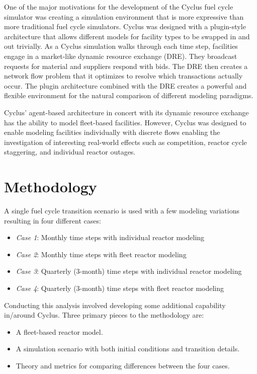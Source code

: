 \documentclass{style}
\begin{document}
One of the major motivations for the development of the Cyclus fuel cycle
simulator was creating a simulation environment that is more expressive than
more traditional fuel cycle simulators.  Cyclus was designed with a
plugin-style architecture that allows different models for facility types to
be swapped in and out trivially.  As a Cyclus simulation walks through each
time step, facilities engage in a market-like dynamic resource exchange (DRE).
They broadcast requests for material and suppliers respond with bids. The DRE
then creates a network flow problem that it optimizes to resolve which
transactions actually occur.  The plugin architecture combined with the DRE
creates a powerful and flexible environment for the natural comparison of
different modeling paradigms.

Cyclus' agent-based architecture in concert with its dynamic resource exchange
has the ability to model fleet-based facilities.  However, Cyclus was designed
to enable modeling facilities individually with discrete flows enabling the
investigation of interesting real-world effects such as competition, reactor
cycle staggering, and individual reactor outages.  

\section{Methodology}

A single fuel cycle transition scenario is used with a few modeling variations
resulting in four different cases:

\begin{itemize}

    \item \emph{Case 1}: Monthly time steps with individual reactor modeling
    \item \emph{Case 2}: Monthly time steps with fleet reactor modeling
    \item \emph{Case 3}: Quarterly (3-month) time steps with individual reactor modeling
    \item \emph{Case 4}: Quarterly (3-month) time steps with fleet reactor modeling

\end{itemize}

Conducting this analysis involved developing some additional capability
in/around Cyclus.  Three primary pieces to the methodology are:

\begin{itemize}

    \item A fleet-based reactor model.

    \item A simulation scenario with both initial conditions and transition
        details.

    \item Theory and metrics for comparing differences between the four cases.

\end{itemize}
\end{document}
